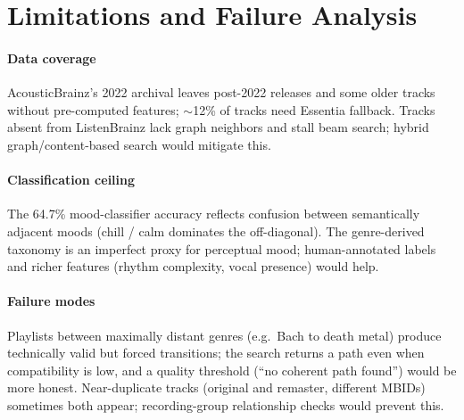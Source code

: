 \section{Limitations and Failure Analysis}

\paragraph{Data coverage} AcousticBrainz's 2022 archival leaves post-2022 releases and some older tracks without pre-computed features; $\sim$12\% of tracks need Essentia fallback. Tracks absent from ListenBrainz lack graph neighbors and stall beam search; hybrid graph/content-based search would mitigate this.

\paragraph{Classification ceiling} The 64.7\% mood-classifier accuracy reflects confusion between semantically adjacent moods (chill / calm dominates the off-diagonal). The genre-derived taxonomy is an imperfect proxy for perceptual mood; human-annotated labels and richer features (rhythm complexity, vocal presence) would help.

\paragraph{Failure modes} Playlists between maximally distant genres (e.g.\ Bach to death metal) produce technically valid but forced transitions; the search returns a path even when compatibility is low, and a quality threshold (``no coherent path found'') would be more honest. Near-duplicate tracks (original and remaster, different MBIDs) sometimes both appear; recording-group relationship checks would prevent this.
